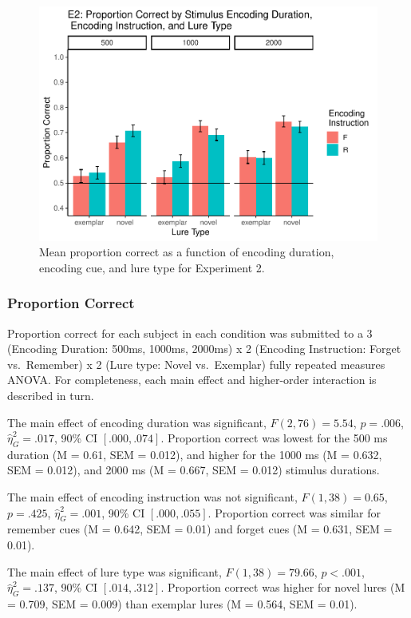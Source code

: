\documentclass[
  english,
  man,floatsintext]{apa6}
\begin{document}
\begin{figure}
\centering
\includegraphics{honorsThesis_NEW_files/figure-latex/e2fig1-1.pdf}
\caption{\label{fig:e2fig1}Mean proportion correct as a function of encoding duration, encoding cue, and lure type for Experiment 2.}
\end{figure}

\hypertarget{proportion-correct-1}{%
\subsubsection{Proportion Correct}\label{proportion-correct-1}}

Proportion correct for each subject in each condition was submitted to a 3 (Encoding Duration: 500ms, 1000ms, 2000ms) x 2 (Encoding Instruction: Forget vs.~Remember) x 2 (Lure type: Novel vs.~Exemplar) fully repeated measures ANOVA. For completeness, each main effect and higher-order interaction is described in turn.

The main effect of encoding duration was significant, \(F(2, 76) = 5.54\), \(p = .006\), \(\hat{\eta}^2_G = .017\), 90\% CI \([.000, .074]\). Proportion correct was lowest for the 500 ms duration (M = 0.61, SEM = 0.012), and higher for the 1000 ms (M = 0.632, SEM = 0.012), and 2000 ms (M = 0.667, SEM = 0.012) stimulus durations.

The main effect of encoding instruction was not significant, \(F(1, 38) = 0.65\), \(p = .425\), \(\hat{\eta}^2_G = .001\), 90\% CI \([.000, .055]\). Proportion correct was similar for remember cues (M = 0.642, SEM = 0.01) and forget cues (M = 0.631, SEM = 0.01).

The main effect of lure type was significant, \(F(1, 38) = 79.66\), \(p < .001\), \(\hat{\eta}^2_G = .137\), 90\% CI \([.014, .312]\). Proportion correct was higher for novel lures (M = 0.709, SEM = 0.009) than exemplar lures (M = 0.564, SEM = 0.01).
\end{document}
